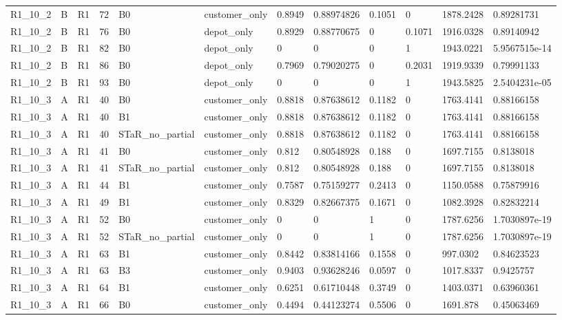 \begin{longtable}{llllllllllll}
R1\_10\_2 & B & R1 & 72 & B0 & customer\_only & 0.8949 & 0.88974826 & 0.1051 & 0 & 1878.2428 & 0.89281731 \\
R1\_10\_2 & B & R1 & 76 & B0 & depot\_only & 0.8929 & 0.88770675 & 0 & 0.1071 & 1916.0328 & 0.89140942 \\
R1\_10\_2 & B & R1 & 82 & B0 & depot\_only & 0 & 0 & 0 & 1 & 1943.0221 & 5.9567515e-14 \\
R1\_10\_2 & B & R1 & 86 & B0 & depot\_only & 0.7969 & 0.79020275 & 0 & 0.2031 & 1919.9339 & 0.79991133 \\
R1\_10\_2 & B & R1 & 93 & B0 & depot\_only & 0 & 0 & 0 & 1 & 1943.5825 & 2.5404231e-05 \\
R1\_10\_3 & A & R1 & 40 & B0 & customer\_only & 0.8818 & 0.87638612 & 0.1182 & 0 & 1763.4141 & 0.88166158 \\
R1\_10\_3 & A & R1 & 40 & B1 & customer\_only & 0.8818 & 0.87638612 & 0.1182 & 0 & 1763.4141 & 0.88166158 \\
R1\_10\_3 & A & R1 & 40 & STaR\_no\_partial & customer\_only & 0.8818 & 0.87638612 & 0.1182 & 0 & 1763.4141 & 0.88166158 \\
R1\_10\_3 & A & R1 & 41 & B0 & customer\_only & 0.812 & 0.80548928 & 0.188 & 0 & 1697.7155 & 0.8138018 \\
R1\_10\_3 & A & R1 & 41 & STaR\_no\_partial & customer\_only & 0.812 & 0.80548928 & 0.188 & 0 & 1697.7155 & 0.8138018 \\
R1\_10\_3 & A & R1 & 44 & B1 & customer\_only & 0.7587 & 0.75159277 & 0.2413 & 0 & 1150.0588 & 0.75879916 \\
R1\_10\_3 & A & R1 & 49 & B1 & customer\_only & 0.8329 & 0.82667375 & 0.1671 & 0 & 1082.3928 & 0.82832214 \\
R1\_10\_3 & A & R1 & 52 & B0 & customer\_only & 0 & 0 & 1 & 0 & 1787.6256 & 1.7030897e-19 \\
R1\_10\_3 & A & R1 & 52 & STaR\_no\_partial & customer\_only & 0 & 0 & 1 & 0 & 1787.6256 & 1.7030897e-19 \\
R1\_10\_3 & A & R1 & 63 & B1 & customer\_only & 0.8442 & 0.83814166 & 0.1558 & 0 & 997.0302 & 0.84623523 \\
R1\_10\_3 & A & R1 & 63 & B3 & customer\_only & 0.9403 & 0.93628246 & 0.0597 & 0 & 1017.8337 & 0.9425757 \\
R1\_10\_3 & A & R1 & 64 & B1 & customer\_only & 0.6251 & 0.61710448 & 0.3749 & 0 & 1403.0371 & 0.63960361 \\
R1\_10\_3 & A & R1 & 66 & B0 & customer\_only & 0.4494 & 0.44123274 & 0.5506 & 0 & 1691.878 & 0.45063469 \\

\end{longtable}
